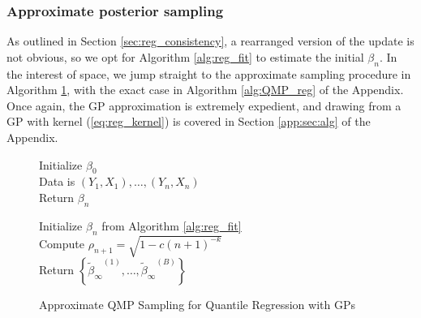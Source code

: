 \documentclass[11pt,a4paper]{article}
\begin{document}
 \subsubsection{Approximate posterior sampling}
As outlined in Section \ref{sec:reg_consistency}, a rearranged version of the update is not obvious, so we opt for {Algorithm \ref{alg:reg_fit}} to estimate the initial $\beta_n$. In the interest of space, we jump straight to the approximate sampling procedure in {Algorithm \ref{alg:reg_approx_QMP}}, with the exact case in {Algorithm \ref{alg:QMP_reg}} of the Appendix. Once again, the GP approximation is extremely expedient, and drawing from a GP with kernel (\ref{eq:reg_kernel}) is covered in Section \ref{app:sec:alg} of the Appendix. 
\begin{figure}[ht]
\center
\small
 \begin{minipage}{.46\linewidth}
\begin{algorithm}[H]\label{alg:reg_fit}
{Initialize $\beta_0$}\\
Data is $(Y_1,X_1),\ldots, (Y_n,X_n)$\\
{Return $\beta_n$}
\caption{Estimation of quantile regression coefficients}
\end{algorithm}
\end{minipage}\hspace{2mm}
 \begin{minipage}{.52\linewidth}
\begin{algorithm}[H]
{Initialize $\beta_n$ from {Algorithm \ref{alg:reg_fit}}}\\
{Compute $\rho_{n+1} = \sqrt{1- c(n+1)^{-k}}$\\}
 {Return $\left\{{\widetilde{\beta}_\infty}^{(1)},\ldots,{\widetilde{\beta}_\infty}^{(B)}\right\}$}
\caption{Approximate QMP Sampling for Quantile Regression with GPs}\label{alg:reg_approx_QMP}
\end{algorithm}
\end{minipage}
\end{figure}\vspace{-5mm}
\end{document}
